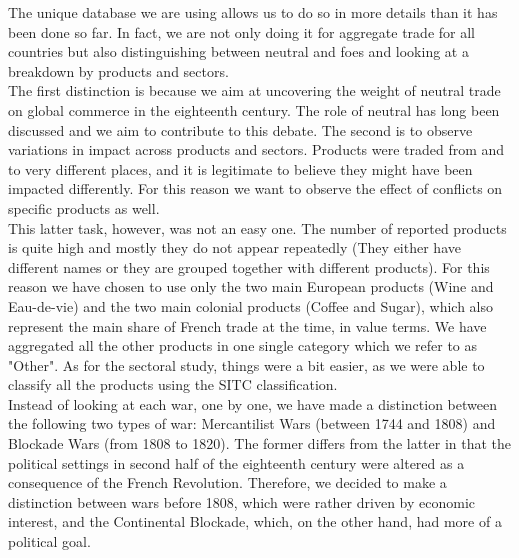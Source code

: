 \documentclass[12pt,a4paper,notitlepage,english]{article}
\begin{document}
The unique database we are using allows us to do so in more details than it has been done so far. In fact, we are not only doing it for aggregate trade for all countries but also distinguishing between neutral and foes and looking at a breakdown by products and sectors. \\
The first distinction is because we aim at uncovering the weight of neutral trade on global commerce in the eighteenth century. The role of neutral has long been discussed and we aim to contribute to this debate. The second is to observe variations in impact across products and sectors. Products were traded from and to very different places, and it is legitimate to believe they might have been impacted differently. For this reason we want to observe the effect of conflicts on specific products as well. \\
This latter task, however, was not an easy one. The number of reported products is quite high and mostly they do not appear repeatedly (They either have different names or they are grouped together with different products). For this reason we have chosen to use only the two main European products (Wine and Eau-de-vie) and the two main colonial products (Coffee and Sugar), which also represent the main share of French trade at the time, in value terms. We have aggregated all the other products in one single category which we refer to as "Other". As for the sectoral study, things were a bit easier, as we were able to classify all the products using the SITC classification. \\
Instead of looking at each war, one by one, we have made a distinction between the following two types of war: Mercantilist Wars (between 1744 and 1808) and Blockade Wars (from 1808 to 1820). The former differs from the latter in that the political settings in second half of the eighteenth century were altered as a consequence of the French Revolution. Therefore, we decided to make a distinction between wars before 1808, which were rather driven by economic interest, and the Continental Blockade, which, on the other hand, had more of a political goal. %
\end{document}
